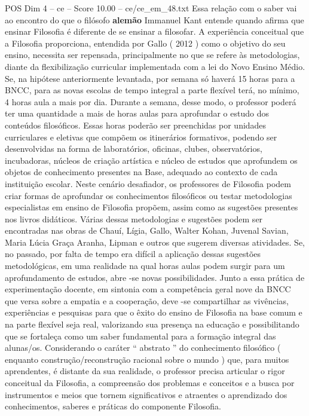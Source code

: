 \begin{textsample}{POS Dim 4 – ce – Score 10.00 – ce/ce\_em\_48.txt}
Essa relação com o saber vai ao encontro do que o filósofo \textbf{alemão} Immanuel Kant entende quando afirma que ensinar Filosofia é diferente de se ensinar a filosofar.
A experiência conceitual que a Filosofia proporciona, entendida por Gallo ( 2012 ) como o objetivo do seu ensino, necessita ser repensada, principalmente no que se refere às metodologias, diante da flexibilização curricular implementada com a lei do Novo Ensino Médio.
Se, na hipótese anteriormente levantada, por semana só haverá 15 horas para a BNCC, para as novas escolas de tempo integral a parte flexível terá, no mínimo, 4 horas aula a mais por dia.
Durante a semana, desse modo, o professor poderá ter uma quantidade a mais de horas aulas para aprofundar o estudo dos conteúdos filosóficos.
Essas horas poderão ser preenchidas por unidades curriculares e eletivas que compõem os itinerários formativos, podendo ser desenvolvidas na forma de laboratórios, oficinas, clubes, observatórios, incubadoras, núcleos de criação artística e núcleo de estudos que aprofundem os objetos de conhecimento presentes na Base, adequado ao contexto de cada instituição escolar.
Neste cenário desafiador, os professores de Filosofia podem criar formas de aprofundar os conhecimentos filosóficos ou testar metodologias especialistas em ensino de Filosofia propõem, assim como as sugestões presentes nos livros didáticos.
Várias dessas metodologias e sugestões podem ser encontradas nas obras de Chauí, Lígia, Gallo, Walter Kohan, Juvenal Savian, Maria Lúcia Graça Aranha, Lipman e outros que sugerem diversas atividades.
Se, no passado, por falta de tempo era difícil a aplicação dessas sugestões metodológicas, em uma realidade na qual horas aulas podem surgir para um aprofundamento de estudos, abre -se novas possibilidades.
Junto a essa prática de experimentação docente, em sintonia com a competência geral nove da BNCC que versa sobre a empatia e a cooperação, deve -se compartilhar as vivências, experiências e pesquisas para que o êxito do ensino de Filosofia na base comum e na parte flexível seja real, valorizando sua presença na educação e possibilitando que se fortaleça como um saber fundamental para a formação integral das alunas/os.
Considerando o caráter “ abstrato ” do conhecimento filosófico ( enquanto construção/reconstrução racional sobre o mundo ) que, para muitos aprendentes, é distante da sua realidade, o professor precisa articular o rigor conceitual da Filosofia, a compreensão dos problemas e conceitos e a busca por instrumentos e meios que tornem significativos e atraentes o aprendizado dos conhecimentos, saberes e práticas do componente Filosofia.

\end{textsample}
